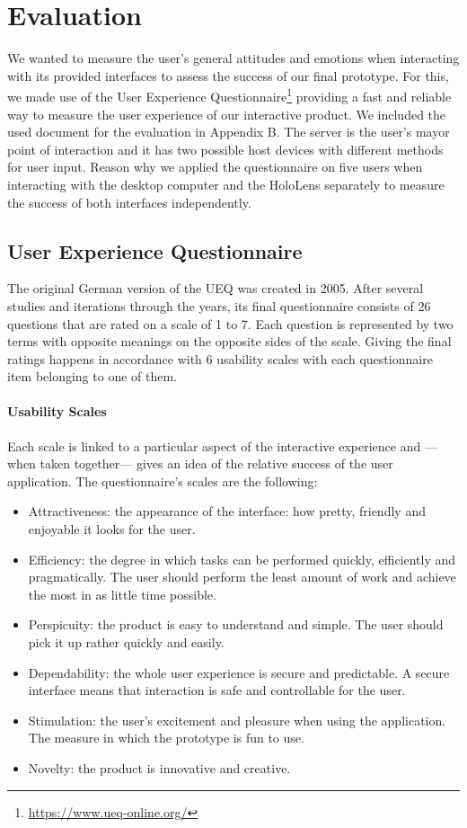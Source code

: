 \newpage
\section{Evaluation}
We wanted to measure the user's general attitudes and emotions when interacting with its provided interfaces to assess the success of our final prototype. For this, we made use of the User Experience Questionnaire\footnote{\protect\url{https://www.ueq-online.org/}} providing a fast and reliable way to measure the user experience of our interactive product. We included the used document for the evaluation in Appendix B. The server is the user's mayor point of interaction and it has two possible host devices with different methods for user input. Reason why we applied the questionnaire on five users when interacting with the desktop computer and the HoloLens separately to measure the success of both interfaces independently.


\subsection{User Experience Questionnaire}
The original German version of the UEQ was created in 2005. After several studies and iterations through the years, its final questionnaire consists of 26 questions that are rated on a scale of 1 to 7. Each question is represented by two terms with opposite meanings on the opposite sides of the scale. Giving the final ratings happens in accordance with 6 usability scales with each questionnaire item belonging to one of them.

\paragraph{Usability Scales}
Each scale is linked to a particular aspect of the interactive experience and ---when taken together--- gives an idea of the relative success of the user application. The questionnaire's scales are the following:
\begin{itemize}
	\item Attractiveness: the appearance of the interface: how pretty, friendly and enjoyable it looks for the user.
	\item Efficiency: the degree in which tasks can be performed quickly, efficiently and pragmatically. The user should perform the least amount of work and achieve the most in as little time possible.
	\item Perspicuity: the product is easy to understand and simple. The user should pick it up rather quickly and easily.
	\item Dependability: the whole user experience is secure and predictable. A secure interface means that interaction is safe and controllable for the user.
	\item Stimulation: the user's excitement and pleasure when using the application. The measure in which the prototype is fun to use.
	\item Novelty: the product is innovative and creative.
	
\end{itemize}

